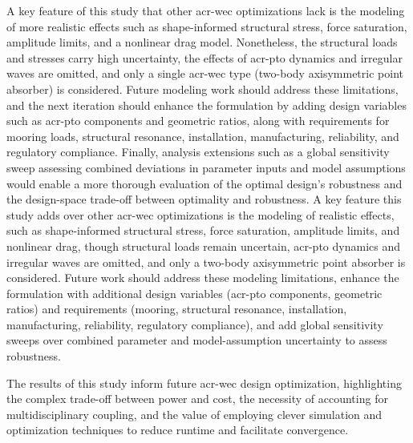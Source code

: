 \ifdefined\DISSERTATION
    A key feature of this study that other \gls{acr-wec} optimizations lack is the modeling of more realistic effects such as shape-informed structural stress, force saturation, amplitude limits, and a nonlinear drag model.
    Nonetheless, the structural loads and stresses carry high uncertainty, the effects of \gls{acr-pto} dynamics and irregular waves are omitted, and only a single \gls{acr-wec} type (two-body axisymmetric point absorber) is considered.
    Future modeling work should address these limitations, and the next iteration should enhance the formulation by adding design variables such as \gls{acr-pto} components and geometric ratios, along with requirements for mooring loads, structural resonance, installation, manufacturing, reliability, and regulatory compliance.
    Finally, analysis extensions such as a global sensitivity sweep assessing combined deviations in parameter inputs and model assumptions would enable a more thorough evaluation of the optimal design's robustness and the design-space trade-off between optimality and robustness.
\else
    A key feature this study adds over other \gls{acr-wec} optimizations is the modeling of realistic effects, such as shape-informed structural stress, force saturation, amplitude limits, and nonlinear drag, though structural loads remain uncertain, \gls{acr-pto} dynamics and irregular waves are omitted, and only a two-body axisymmetric point absorber is considered.
    Future work should address these modeling limitations, enhance the formulation with additional design variables (\gls{acr-pto} components, geometric ratios) and requirements (mooring, structural resonance, installation, manufacturing, reliability, regulatory compliance), and add global sensitivity sweeps over combined parameter and model-assumption uncertainty to assess robustness.
\fi

The results of this study inform future \gls{acr-wec} design optimization, highlighting the complex trade-off between power and cost, the necessity of accounting for multidisciplinary coupling, and the value of employing clever simulation and optimization techniques to reduce runtime and facilitate convergence.
